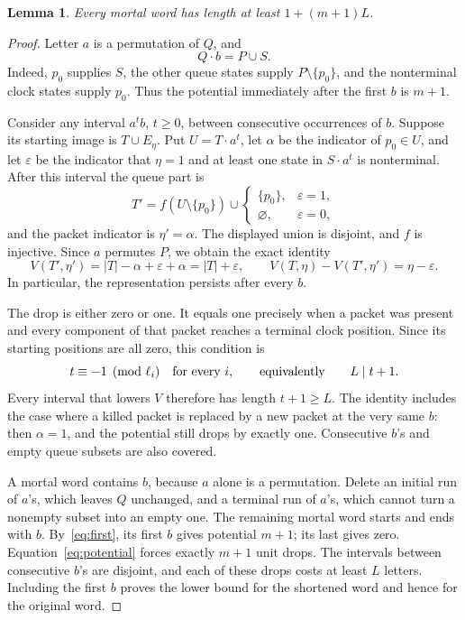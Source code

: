 \documentclass[acmsmall,screen,nonacm,11pt]{acmart}
\newtheorem{lemma}[theorem]{Lemma}
\newcommand{\emp}{\varnothing}
\begin{document}
\begin{lemma}\label{lem:lower}
Every mortal word has length at least $1+(m+1)L$.
\end{lemma}
\begin{proof}
Letter $a$ is a permutation of $Q$, and
\begin{equation}\label{eq:first}
 Q\cdot b=P\cup S.
\end{equation}
Indeed, $p_0$ supplies $S$, the other queue states supply
$P\setminus\{p_0\}$, and the nonterminal clock states supply $p_0$.
Thus the potential immediately after the first $b$ is $m+1$.

Consider any interval $a^t b$, $t\geq0$, between consecutive occurrences of
$b$. Suppose its starting image is $T\cup E_\eta$.
Put $U=T\cdot a^t$, let $\alpha$ be the indicator of $p_0\in U$, and let
$\varepsilon$ be the indicator that $\eta=1$ and at least one state in
$S\cdot a^t$ is nonterminal. After this interval the queue part is
\[
 T'=f(U\setminus\{p_0\})\cup
 \begin{cases}\{p_0\},&\varepsilon=1,\\\emp,&\varepsilon=0,\end{cases}
\]
and the packet indicator is $\eta'=\alpha$. The displayed union is disjoint,
and $f$ is injective. Since $a$ permutes $P$, we obtain the exact identity
\begin{equation}\label{eq:potential}
 V(T',\eta')=|T|-\alpha+\varepsilon+\alpha
             =|T|+\varepsilon,
 \qquad V(T,\eta)-V(T',\eta')=\eta-\varepsilon.
\end{equation}
In particular, the representation persists after every $b$.

The drop is either zero or one. It equals one precisely when a packet was
present and every component of that packet reaches a terminal clock position.
Since its starting positions are all zero, this condition is
\[
 t\equiv-1\pmod{\ell_i}\quad\hbox{for every }i,
 \qquad\hbox{equivalently}\qquad L\mid t+1.
\]
Every interval that lowers $V$ therefore has length $t+1\geq L$.
The identity includes the case where a killed packet is replaced by a new
packet at the very same $b$: then $\alpha=1$, and the potential still drops
by exactly one. Consecutive $b$'s and empty queue subsets are also covered.

A mortal word contains $b$, because $a$ alone is a permutation. Delete an
initial run of $a$'s, which leaves $Q$ unchanged, and a terminal run of $a$'s,
which cannot turn a nonempty subset into an empty one. The remaining mortal
word starts and ends with $b$. By~\eqref{eq:first}, its first $b$ gives
potential $m+1$; its last gives zero. Equation~\eqref{eq:potential} forces
exactly $m+1$ unit drops. The intervals between consecutive $b$'s are
disjoint, and each of these drops costs at least $L$ letters. Including the
first $b$ proves the lower bound for the shortened word and hence for the
original word.
\end{proof}
\end{document}
